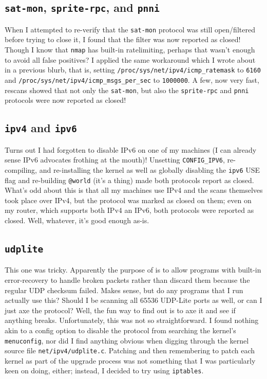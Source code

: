 \documentclass{article}
\begin{document}
\subsection{\texttt{sat-mon}, \texttt{sprite-rpc}, and \texttt{pnni}}
When I attempted to re-verify that the \texttt{sat-mon} protocol was still open/filtered before trying to close it, I found that the filter was now reported as closed!  Though I know that \texttt{nmap} has built-in ratelimiting, perhaps that wasn't enough to avoid all false positives?  I applied the same workaround which I wrote about in a previous blurb, that is, setting \texttt{/proc/sys/net/ipv4/icmp_ratemask} to \texttt{6160} and \texttt{/proc/sys/net/ipv4/icmp_msgs_per_sec} to \texttt{1000000}.  A few, now very fast, rescans showed that not only the \texttt{sat-mon}, but also the \texttt{sprite-rpc} and \texttt{pnni} protocols were now reported as closed!

\subsection{\texttt{ipv4} and \texttt{ipv6}}
Turns out I had forgotten to disable IPv6 on one of my machines (I can already sense IPv6 advocates frothing at the mouth)!  Unsetting \texttt{CONFIG_IPV6}, re-compiling, and re-installing the kernel as well as globally disabling the \texttt{ipv6} USE flag and re-building \texttt{@world} (it's a  thing) made both protocols report as closed.  What's odd about this is that all my machines use IPv4 and the scans themselves took place over IPv4, but the protocol was marked as closed on them; even on my router, which supports both IPv4 an IPv6, both protocols were reported as closed.  Well, whatever, it's good enough as-is.

\subsection{\texttt{udplite}}
This one was tricky.  Apparently the purpose of  is to allow programs with built-in error-recovery to handle broken packets rather than discard them because the regular UDP checksum failed.  Makes sense, but do any programs that I run actually use this?  Should I be scanning all 65536 UDP-Lite ports as well, or can I just axe the protocol?  Well, the fun way to find out is to axe it and see if anything breaks.  Unfortunately, this was not so straightforward.  I found nothing akin to a config option to disable the protocol from searching the kernel's \texttt{menuconfig}, nor did I find anything obvious when digging through the kernel source file \texttt{net/ipv4/udplite.c}.  Patching and then remembering to patch each kernel as part of the upgrade process was not something that I was particularly keen on doing, either; instead, I decided to try using \texttt{iptables}.
\end{document}
